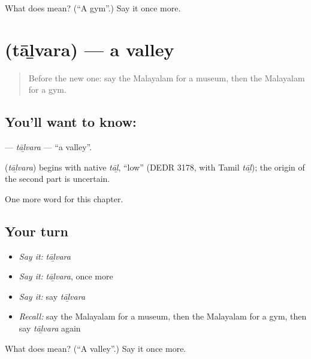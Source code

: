 \begin{tcolorbox}[breakable,colback=teal!4,colframe=teal!35!black,title={Before you move on}]
What does  mean? (\textquotedblleft{}A gym\textquotedblright{}.) Say it once more.
\end{tcolorbox}
\section[\texorpdfstring{\ml{താഴ്വര} (tāḻvara)}{താഴ്വര (tāḻvara)}]{ (tāḻvara) — a valley}

\label{lesson:ML-C279-talvara}



\begin{quote}
Before the new one: say the Malayalam for a museum, then the Malayalam for a gym.
\end{quote}

\subsection*{You'll want to know: }
\textbf{} — \emph{tāḻvara} — \textquotedblleft{}a valley\textquotedblright{}.

\begin{cousinweb}
\textbf{} (\emph{tāḻvara}) begins with native \emph{tāḻ}, \textquotedblleft{}low\textquotedblright{} (DEDR 3178, with Tamil \emph{tāḻ}); the origin of the second part is uncertain.
\end{cousinweb}

\begin{grammarlens}[title={What you've built}]
One more word for this chapter.
\end{grammarlens}

\subsection*{Your turn}
\begin{itemize}
\raggedright
  \item \emph{Say it:} \emph{tāḻvara}
  \item \emph{Say it:} \emph{tāḻvara}, once more
  \item \emph{Say it:} say \emph{tāḻvara}
  \item \emph{Recall:} say the Malayalam for a museum, then the Malayalam for a gym, then say \emph{tāḻvara} again
\end{itemize}

\begin{tcolorbox}[breakable,colback=teal!4,colframe=teal!35!black,title={Before you move on}]
What does  mean? (\textquotedblleft{}A valley\textquotedblright{}.) Say it once more.
\end{tcolorbox}
